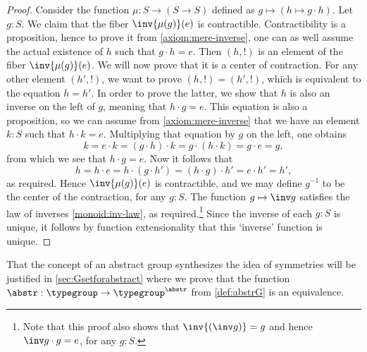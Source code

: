 \begin{proof}
  Consider the function $\mu: S \to (S \to S)$ defined as
  $g\mapsto (h \mapsto g\cdot h)$. Let $g:S$. We claim that the fiber
  $\inv{\mu(g)}(e)$ is contractible.  Contractibility is a proposition, 
  hence to
  prove it from \ref{axiom:mere-inverse}, one can as well assume the
  actual existence of $h$ such that $g\cdot h = e$. Then $(h,!)$ is an
  element of the fiber $\inv{\mu(g)}(e)$. We will now prove that it is
  a center of contraction. For any other element $(h',!)$, we want to
  prove $(h,!) = (h',!)$, which is equivalent to the equation $h=h'$. In
  order to prove the latter, we show that $h$ is also an inverse on
  the left of $g$, meaning that $h\cdot g=e$.  This equation is also a
  proposition, so we can assume from \ref{axiom:mere-inverse} that we have an
  element $k:S$ such that $h\cdot k = e$.  Multiplying that equation by
  $g$ on the left, one obtains
  \begin{displaymath}
    k = e \cdot k = (g\cdot h)\cdot k = g\cdot (h\cdot k) = g\cdot e = g,
  \end{displaymath}
  from which we see that $h\cdot g=e$.
  Now it follows that
  \begin{displaymath}
    h = h \cdot e = h \cdot (g\cdot h') = (h \cdot g) \cdot h' = e \cdot h' = h',
  \end{displaymath}
  as required. Hence $\inv{\mu(g)}(e)$ is contractible, and we may define $g^{-1}$ to
  be the center of the contraction, for any $g:S$.
  The function $g \mapsto \inv g$ satisfies the law of inverses 
  \ref{monoid:inv-law}, as required.\footnote{%
  Note that this proof also shows that  $\inv{(\inv g)} = g$ and hence
  $\inv g \cdot g = e$, for any $g:S$.}
  Since the inverse of each $g:S$ is unique, it follows by function
  extensionality that this `inverse' function is unique.
\end{proof}

\begin{remark}
  That the concept of an abstract group synthesizes the idea of symmetries
  will be justified in \cref{sec:Gsetforabstract} where we prove that
  the function $\abstr:\typegroup\to\typegroup^{\abstr}$ from 
  \cref{def:abstrG} is an equivalence.
\end{remark}

